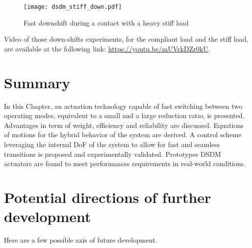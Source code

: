 \begin{figure}[p]
	\centering
		\texttt{[image: dsdm\_stiff\_down.pdf]}
	\caption{ Fast downshift during a contact with a heavy stiff load }
	\label{fig:dsdm_stiff_down}
\end{figure}

Video of those down-shifts experiments, for the compliant load and the stiff load, are available at the following link: \href{https://youtu.be/mUVrkDZr0kU}{https://youtu.be/mUVrkDZr0kU}.

%
%
%






\newpage

\section{Summary}

In this Chapter, an actuation technology capable of fast switching between two operating modes, equivalent to a small and a large reduction ratio, is presented. Advantages in term of weight, efficiency and reliability are discussed. Equations of motions for the hybrid behavior of the system are derived. A control scheme leveraging the internal DoF of the system to allow for fast and seamless transitions is proposed and experimentally validated. Prototypes DSDM actuators are found to meet performances requirements in real-world conditions.

\section{Potential directions of further development}

Here are a few possible axis of future development. 

